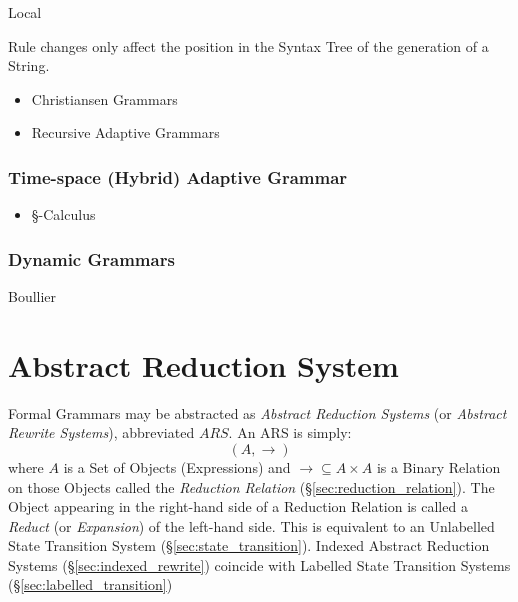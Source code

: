 Local

Rule changes only affect the position in the Syntax Tree of the
generation of a String.

\begin{itemize}
  \item Christiansen Grammars
  \item Recursive Adaptive Grammars
\end{itemize}



\subsubsection{Time-space (Hybrid) Adaptive Grammar}
\label{sec:timespace_adaptive}

\begin{itemize}
  \item \S-Calculus
\end{itemize}



\subsubsection{Dynamic Grammars}\label{sec:dynamic_grammar}

Boullier\cite{boullier94}



\section{Abstract Reduction System}\label{sec:abstract_rewrite}

Formal Grammars may be abstracted as \emph{Abstract Reduction Systems}
(or \emph{Abstract Rewrite Systems}), abbreviated $ARS$. An ARS is
simply:
\[
  (A,\rightarrow)
\]
where $A$ is a Set of Objects (Expressions) and $\rightarrow \subseteq
A \times A$ is a Binary Relation on those Objects called the
\emph{Reduction Relation} (\S\ref{sec:reduction_relation}). The Object
appearing in the right-hand side of a Reduction Relation is called a
\emph{Reduct} (or \emph{Expansion}) of the left-hand side. This is
equivalent to an Unlabelled State Transition System
(\S\ref{sec:state_transition}). Indexed Abstract Reduction Systems
(\S\ref{sec:indexed_rewrite}) coincide with Labelled State
Transition Systems (\S\ref{sec:labelled_transition})

